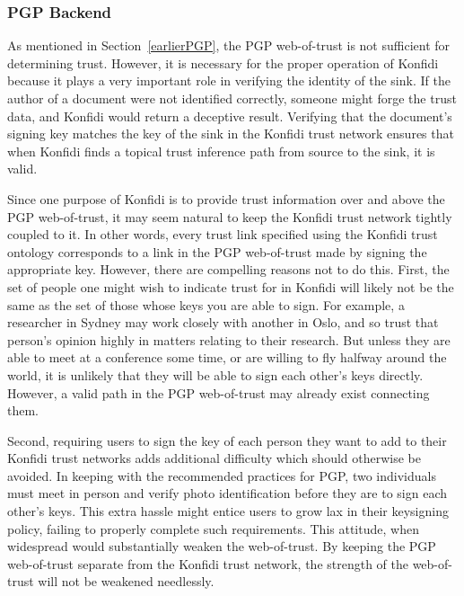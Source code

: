 \documentclass[onecolumn]{acm_proc_article-sp}
\begin{document}
\subsubsection{PGP Backend}
As mentioned in Section~\ref{earlierPGP}, the PGP web-of-trust is not sufficient for determining trust.  However, it is necessary for the proper operation of Konfidi because it plays a very important role in verifying the identity of the sink.  If the author of a document were not identified correctly, someone might forge the trust data, and Konfidi would return a deceptive result.  Verifying that the document's signing key matches the key of the sink in the Konfidi trust network ensures that when Konfidi finds a topical trust inference path from source to the sink, it is valid.

Since one purpose of Konfidi is to provide trust information over and above the PGP web-of-trust, it may seem natural to keep the Konfidi trust network tightly coupled to it.  In other words, every trust link specified using the Konfidi trust ontology corresponds to a link in the PGP web-of-trust made by signing the appropriate key.  However, there are compelling reasons not to do this.  First, the set of people one might wish to indicate trust for in Konfidi will likely not be the same as the set of those whose keys you are able to sign.  For example, a researcher in Sydney may work closely with another in Oslo, and so trust that person's opinion highly in matters relating to their research.  But unless they are able to meet at a conference some time, or are willing to fly halfway around the world, it is unlikely that they will be able to sign each other's keys directly.  However, a valid path in the PGP web-of-trust may already exist connecting them.

Second, requiring users to sign the key of each person they want to add to their Konfidi trust networks adds additional difficulty which should otherwise be avoided.  In keeping with the recommended practices for PGP, two individuals must meet in person and verify photo identification before they are to sign each other's keys.  This extra hassle might entice users to grow lax in their keysigning policy, failing to properly complete such requirements.  This attitude, when widespread would substantially weaken the web-of-trust.  By keeping the PGP web-of-trust separate from the Konfidi trust network, the strength of the web-of-trust will not be weakened needlessly.
\end{document}
